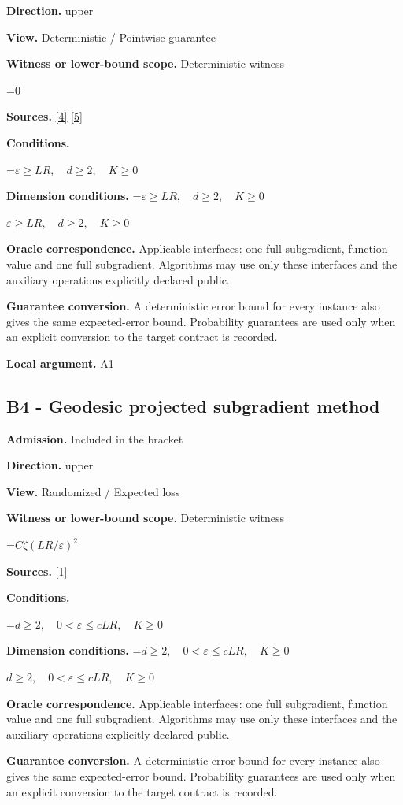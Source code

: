 \documentclass[10pt,a4paper]{article}
\newcommand{\AtlasMath}[1]{\par\begingroup\centering\setbox0=\hbox{$\displaystyle #1$}\ifdim\wd0>1.4\linewidth\typeout{ATLAS WIDE FORMULA: \the\wd0}\fi\ifdim\wd0>\linewidth\resizebox{\linewidth}{!}{\box0}\else\box0\fi\par\endgroup}
\newcommand{\AtlasInlineMath}[1]{\begingroup\setbox0=\hbox{$#1$}\ifdim\wd0>.4\linewidth\endgroup\AtlasMath{#1}\else\endgroup$#1$\fi}
\begin{document}
\textbf{Direction.} upper

\textbf{View.} Deterministic / Pointwise guarantee

\textbf{Witness or lower-bound scope.} Deterministic witness

\AtlasMath{0}
\textbf{Sources.} \href{https://arxiv.org/pdf/2605.17540v4}{[4]} \href{https://arxiv.org/pdf/1405.4980}{[5]}

\textbf{Conditions.} 
\AtlasMath{\varepsilon\ge LR,\quad d\ge2,\quad K\ge0}


\textbf{Dimension conditions.} \AtlasInlineMath{\varepsilon\ge LR,\quad d\ge2,\quad K\ge0}

\textbf{Oracle correspondence.} Applicable interfaces: one full subgradient, function value and one full subgradient. Algorithms may use only these interfaces and the auxiliary operations explicitly declared public.

\textbf{Guarantee conversion.} A deterministic error bound for every instance also gives the same expected-error bound. Probability guarantees are used only when an explicit conversion to the target contract is recorded.

\textbf{Local argument.} A1

\subsection{B4 - Geodesic projected subgradient method}
\textbf{Admission.} Included in the bracket

\textbf{Direction.} upper

\textbf{View.} Randomized / Expected loss

\textbf{Witness or lower-bound scope.} Deterministic witness

\AtlasMath{C\zeta(LR/\varepsilon)^2}
\textbf{Sources.} \href{https://proceedings.mlr.press/v49/zhang16b.pdf}{[1]}

\textbf{Conditions.} 
\AtlasMath{d\ge2,\quad0<\varepsilon\le cLR,\quad K\ge0}


\textbf{Dimension conditions.} \AtlasInlineMath{d\ge2,\quad0<\varepsilon\le cLR,\quad K\ge0}

\textbf{Oracle correspondence.} Applicable interfaces: one full subgradient, function value and one full subgradient. Algorithms may use only these interfaces and the auxiliary operations explicitly declared public.

\textbf{Guarantee conversion.} A deterministic error bound for every instance also gives the same expected-error bound. Probability guarantees are used only when an explicit conversion to the target contract is recorded.
\end{document}
